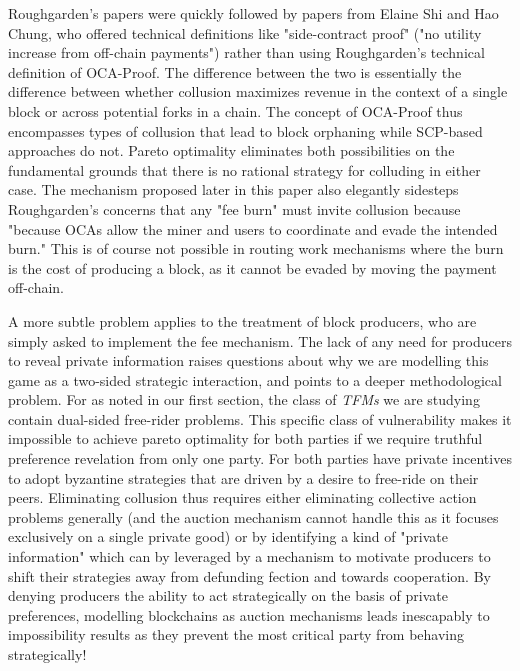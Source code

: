 Roughgarden's papers were quickly followed by papers from Elaine Shi and Hao Chung, who offered technical definitions like "side-contract proof" ("no utility increase from off-chain payments") rather than using Roughgarden's technical definition of OCA-Proof. The difference between the two is essentially the difference between whether collusion maximizes revenue in the context of a single block or across potential forks in a chain. The concept of OCA-Proof thus encompasses types of collusion that lead to block orphaning while SCP-based approaches do not. Pareto optimality eliminates both possibilities on the fundamental grounds that there is no rational strategy for colluding in either case. The mechanism proposed later in this paper also elegantly sidesteps Roughgarden's concerns that any "fee burn" must invite collusion because "because OCAs allow the miner and users to coordinate and evade the intended burn." This is of course not possible in routing work mechanisms where the burn is the cost of producing a block, as it cannot be evaded by moving the payment off-chain.





A more subtle problem applies to the treatment of block producers, who are simply asked to implement the fee mechanism. The lack of any need for producers to reveal private information raises questions about why we are modelling this game as a two-sided strategic interaction, and points to a deeper methodological problem. For as noted in our first section, the class of \textit{TFMs} we are studying contain dual-sided free-rider problems. This specific class of vulnerability makes it impossible to achieve pareto optimality for both parties if we require truthful preference revelation from only one party. For both parties have private incentives to adopt byzantine strategies that are driven by a desire to free-ride on their peers. Eliminating collusion thus requires either eliminating collective action problems generally (and the auction mechanism cannot handle this as it focuses exclusively on a single private good) or by identifying a kind of "private information" which can by leveraged by a mechanism to motivate producers to shift their strategies away from defunding fection and towards cooperation. By denying producers the ability to act strategically on the basis of private preferences, modelling blockchains as auction mechanisms leads inescapably to impossibility results as they prevent the most critical party from behaving strategically!

